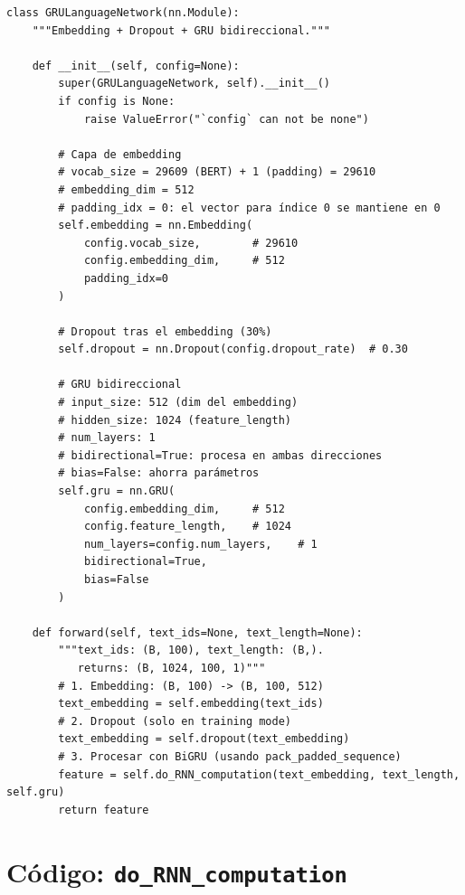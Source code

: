 \begin{verbatim}
class GRULanguageNetwork(nn.Module):
    """Embedding + Dropout + GRU bidireccional."""

    def __init__(self, config=None):
        super(GRULanguageNetwork, self).__init__()
        if config is None:
            raise ValueError("`config` can not be none")

        # Capa de embedding
        # vocab_size = 29609 (BERT) + 1 (padding) = 29610
        # embedding_dim = 512
        # padding_idx = 0: el vector para índice 0 se mantiene en 0
        self.embedding = nn.Embedding(
            config.vocab_size,        # 29610
            config.embedding_dim,     # 512
            padding_idx=0
        )

        # Dropout tras el embedding (30%)
        self.dropout = nn.Dropout(config.dropout_rate)  # 0.30

        # GRU bidireccional
        # input_size: 512 (dim del embedding)
        # hidden_size: 1024 (feature_length)
        # num_layers: 1
        # bidirectional=True: procesa en ambas direcciones
        # bias=False: ahorra parámetros
        self.gru = nn.GRU(
            config.embedding_dim,     # 512
            config.feature_length,    # 1024
            num_layers=config.num_layers,    # 1
            bidirectional=True,
            bias=False
        )

    def forward(self, text_ids=None, text_length=None):
        """text_ids: (B, 100), text_length: (B,).
           returns: (B, 1024, 100, 1)"""
        # 1. Embedding: (B, 100) -> (B, 100, 512)
        text_embedding = self.embedding(text_ids)
        # 2. Dropout (solo en training mode)
        text_embedding = self.dropout(text_embedding)
        # 3. Procesar con BiGRU (usando pack_padded_sequence)
        feature = self.do_RNN_computation(text_embedding, text_length, self.gru)
        return feature
\end{verbatim}

\section{Código: \texttt{do\_RNN\_computation}}

